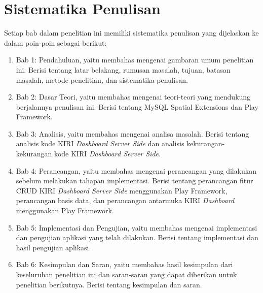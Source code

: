 \section{Sistematika Penulisan}
\label{sec:sistematika_penulisan}
Setiap bab dalam penelitian ini memiliki sistematika penulisan yang dijelaskan ke dalam poin-poin sebagai berikut:
	\begin{enumerate}
		\item Bab 1: Pendahuluan, yaitu membahas mengenai gambaran umum penelitian ini. Berisi tentang latar belakang, rumusan masalah, tujuan, batasan masalah, metode penelitian, dan sistematika penulisan.
		\item Bab 2: Dasar Teori, yaitu membahas mengenai teori-teori yang mendukung berjalannya penulisan ini. Berisi tentang MySQL Spatial Extensions dan Play Framework.
		\item Bab 3: Analisis, yaitu membahas mengenai analisa masalah. Berisi tentang analisis kode KIRI \textit{Dashboard Server Side} dan analisis kekurangan-kekurangan kode KIRI \textit{Dashboard Server Side}.
		\item Bab 4: Perancangan, yaitu membahas mengenai perancangan yang dilakukan sebelum melakukan tahapan implementasi. Berisi tentang perancangan fitur CRUD KIRI \textit{Dashboard Server Side} menggunakan Play Framework, perancangan basis data, dan perancangan antarmuka KIRI \textit{Dashboard} menggunakan Play Framework.
		\item Bab 5: Implementasi dan Pengujian, yaitu membahas mengenai implementasi dan pengujian aplikasi yang telah dilakukan. Berisi tentang implementasi dan hasil pengujian aplikasi.
		\item Bab 6: Kesimpulan dan Saran, yaitu membahas hasil kesimpulan dari keseluruhan penelitian ini dan saran-saran yang dapat
diberikan untuk penelitian berikutnya. Berisi tentang kesimpulan dan saran.
	\end{enumerate}